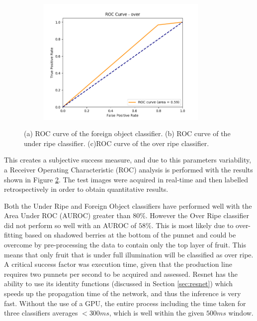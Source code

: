 \documentclass[fleqn,twoside,12pt]{report}
\begin{document}
\begin{figure}[ht]
	\begin{subfigure}{0.5\linewidth}
		\centering
		\includegraphics[width=0.9\textwidth]{ROC_over.png}
		\caption{}
		\label{fig:ROC_o}
	\end{subfigure}%
	
	\caption{(a) ROC curve of the foreign object classifier. (b) ROC curve of the under ripe classifier. (c)ROC curve of the over ripe classifier.}
	\label{fig:ROCs}
\end{figure}


This creates a subjective success measure, and due to this parameters variability, a Receiver Operating Characteristic (ROC) analysis  is performed with the results shown in Figure \ref{fig:ROCs}. The test images were acquired in real-time and then labelled retrospectively in order to obtain quantitative results.

Both the Under Ripe and Foreign Object classifiers have performed well with the  Area Under ROC (AUROC) greater than $80\%$. However the Over Ripe classifier did not perform so well with an AUROC of $58\%$. This is most likely due to over-fitting based on shadowed berries at the bottom of the punnet and could be overcome by pre-processing the data to contain only the top layer of fruit. This means that only fruit that is under full illumination will be classified as over ripe. A critical success factor was execution time, given that the production line requires two punnets per second to be acquired and assessed. Resnet has the ability to use its identity functions (discussed in Section \ref{sec:resnet}) which speeds up the propagation time of the network, and thus the inference is very fast. Without the use of a GPU, the entire process including the time taken for three classifiers averages $<300ms$, which is well within the given $500ms$ window.
\end{document}
